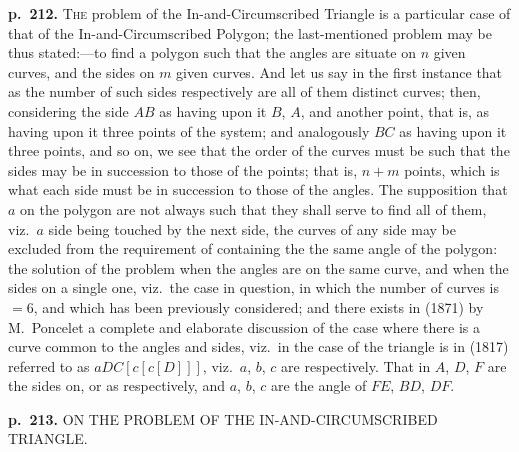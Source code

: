 \documentclass[11pt,a4paper]{book}
\begin{document}
\noindent
\textbf{p.~212.}  \textsc{The} problem of the In-and-Circumscribed Triangle is a particular case of that of
the In-and-Circumscribed Polygon; the last-mentioned problem may be thus stated:---to
find a polygon such that the angles are situate on $n$ given curves, and the sides on
$m$ given curves.  And let us say in the first instance that as the number of such
sides respectively are all of them distinct curves; then, considering the side $AB$ as
having upon it $B$, $A$, and another point, that is, as having upon it three points of
the system; and analogously $BC$ as having upon it three points, and so on, we see
that the order of the curves must be such that the sides may be in succession to
those of the points; that is, $n + m$ points, which is what each side must be in succession
to those of the angles.  The supposition that $a$ on the polygon are not always such
that they shall serve to find all of them, viz.\ $a$ side being touched by the next side,
the curves of any side may be excluded from the requirement of containing the
the same angle of the polygon: the solution of the problem when the angles are on
the same curve, and when the sides on a single one, viz.\ the case in question, in
which the number of curves is $= 6$, and which has been previously considered;
and there exists in (1871) by M.~Poncelet a complete and elaborate discussion of the
case where there is a curve common to the angles and sides, viz.\ in the case of the
triangle is in (1817) referred to as $aDC[c[c[D]]]$, viz.\ $a$, $b$, $c$ are respectively. That
in $A$, $D$, $F$ are the sides on, or as respectively, and $a$, $b$, $c$ are the angle of $FE$, $BD$, $DF$.

\clearpage

\noindent
\textbf{p.~213.}  ON THE PROBLEM OF THE IN-AND-CIRCUMSCRIBED TRIANGLE.
\end{document}
